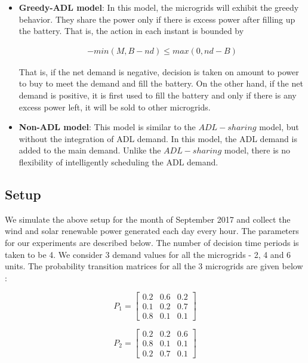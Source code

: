 \begin{itemize}
	\item \textbf{Greedy-ADL model}: In this model, the microgrids will exhibit the greedy behavior. They share the power only if there is excess power after filling up the battery. That is, the action in each instant is bounded by   
	
	\begin{align}
	-min(M, B - nd) \leq max(0,nd - B) 
	\end{align}
	
	That is, if the net demand is negative, decision is taken on amount to power to buy to meet the demand and fill the battery. On the other hand, if the net demand is positive, it is first used to fill the battery and only if there is any excess power left, it will be sold to other microgrids.
	
	\item \textbf{Non-ADL model}:  This model is similar to the $ADL-sharing$ model, but without the integration of ADL demand. In this model, the ADL demand is added to the main demand. Unlike the $ADL-sharing$ model, there is no flexibility of intelligently scheduling the ADL demand. 
	
\end{itemize}

\subsection{Setup}


We simulate the above setup for the month of September 2017 and collect the wind and solar renewable power generated each day every hour. The parameters for our experiments are described below. The number of decision time periods is taken to be 4. We consider 3 demand values for all the microgrids - 2, 4 and 6 units. The probability transition matrices for all the 3 microgrids are given below :


\[
P_{1}=
\begin{bmatrix}
0.2 & 0.6 & 0.2 \\
0.1 & 0.2 & 0.7 \\
0.8 & 0.1 & 0.1
\end{bmatrix}
\]

\[
P_{2}=
\begin{bmatrix}
0.2 & 0.2 & 0.6 \\
0.8 & 0.1 & 0.1 \\
0.2 & 0.7 & 0.1
\end{bmatrix}
\]

